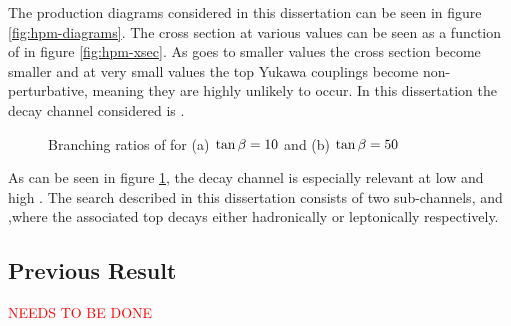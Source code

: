 	The production diagrams considered in this dissertation can be seen in figure \ref{fig:hpm-diagrams}. The cross section at various \tanb values can be seen as a function of \mHpm in figure \ref{fig:hpm-xsec}. As \tanb goes to smaller values the \Hpm cross section become smaller and at very small values the top Yukawa couplings become non-perturbative, meaning they are highly unlikely to occur. In this dissertation the decay channel considered is \HpmLong. 
	\begin{figure}[!h]
		\centering
		\caption{\label{fig:hpm-br} Branching ratios of \Hpm for (a) $\tan\beta = 10$ and (b) $\tan\beta = 50$ ~\cite{Heinemeyer:2013tqa} }
	\end{figure}
	As can be seen in figure \ref{fig:hpm-br}, the \HpmLong decay channel is especially relevant at low \mHpm and high \tanb. The search described in this dissertation consists of two sub-channels, \taujets and \taulep ,where the associated top decays either hadronically or leptonically respectively. 

	\subsection{Previous Result}\label{ssec:Prev Hpm}
		\textcolor{red}{NEEDS TO BE DONE}